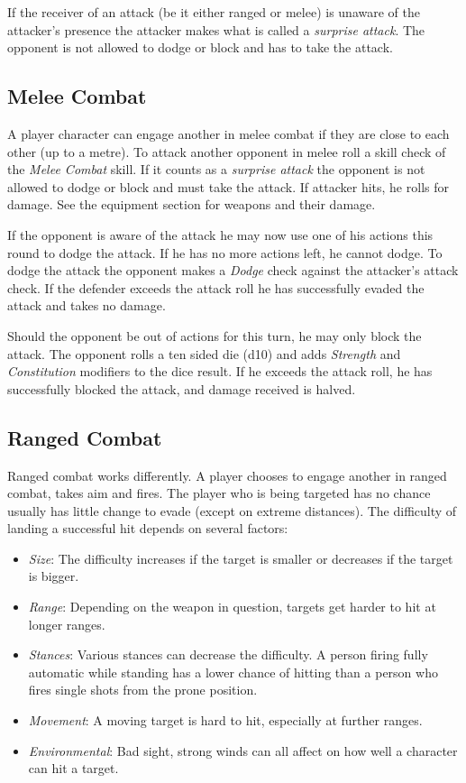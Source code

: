 If the receiver of an attack (be it either ranged or melee) is unaware of the
attacker's presence the attacker makes what is called a \emph{surprise attack}.
The opponent is not allowed to dodge or block and has to take the attack.

\subsection{Melee Combat}

A player character can engage another in melee combat if they are close to each
other (up to a metre). To attack another opponent in melee roll a skill check
of the \emph{Melee Combat} skill. If it counts as a \emph{surprise attack} the
opponent is not allowed to dodge or block and must take the attack. If attacker
hits, he rolls for damage. See the equipment section for weapons and their
damage.

If the opponent is aware of the attack he may now use one of his actions this
round to dodge the attack. If he has no more actions left, he cannot dodge. To
dodge the attack the opponent makes a \emph{Dodge} check against the attacker's
attack check. If the defender exceeds the attack roll he has successfully evaded
the attack and takes no damage.

Should the opponent be out of actions for this turn, he may only block the
attack. The opponent rolls a ten sided die (d10) and adds \emph{Strength} and
\emph{Constitution} modifiers to the dice result. If he exceeds the attack roll,
he has successfully blocked the attack, and damage received is halved.

\subsection{Ranged Combat}

Ranged combat works differently. A player chooses to engage another in ranged
combat, takes aim and fires. The player who is being targeted has no chance
usually has little change to evade (except on extreme distances). The difficulty
of landing a successful hit depends on several factors:

\begin{itemize}
\item \emph{Size}: The difficulty increases if the target is smaller or
  decreases if the target is bigger.
\item \emph{Range}: Depending on the weapon in question, targets get harder to
  hit at longer ranges.
\item \emph{Stances}: Various stances can decrease the difficulty. A person
  firing fully automatic while standing has a lower chance of hitting than a
  person who fires single shots from the prone position.
\item \emph{Movement}: A moving target is hard to hit, especially at further
  ranges.
\item \emph{Environmental}: Bad sight, strong winds can all affect on how well
  a character can hit a target.
\end{itemize}

